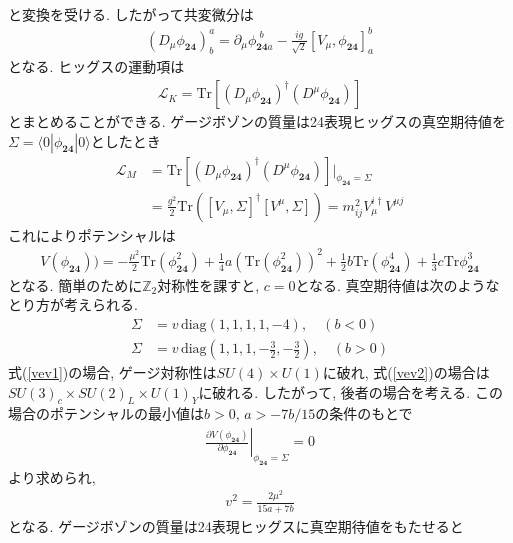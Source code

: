 \documentclass[uplatex,dvipdfmx,a4paper,titlepage]{jsbook}
\theoremstyle{plain}
\theoremstyle{definition}
\begin{document}
{\begin{align}
\end{align}
と変換を受ける.
したがって共変微分は
\begin{align}
  (D_\mu\phi_{\bm{24}})^a_b = \partial_\mu \phi_{\bm{24}a}^{\,\,b}  -\frac{ig}{\sqrt{2}}[V_\mu, \phi_{\bm{24}}]^b_{a}
\end{align}
となる.
ヒッグスの運動項は
\begin{align}
  \mathcal{L}_K = \mathrm{Tr}[(D_\mu \phi_{\bm{24}})^\dagger (D^\mu \phi_{\bm{24}})]
\end{align}
とまとめることができる.
ゲージボゾンの質量は24表現ヒッグスの真空期待値を$\Sigma = \langle 0|\phi_{\bm{24}}| 0\rangle$としたとき
\begin{align}
  \mathcal{L}_M &= \mathrm{Tr}[(D_\mu \phi_{\bm{24}})^\dagger (D^\mu \phi_{\bm{24}})]|_{\phi_{\bm{24}}=\Sigma}\nonumber\\
                &= \frac{g^2}{2}\mathrm{Tr}\left([V_\mu, \Sigma]^\dagger [V^\mu,\Sigma]\right) = m_{ij}^2 V_\mu^{i\dagger}V^{\mu j}
\end{align}
これによりポテンシャルは
\begin{align}
  V(\phi_{\bm{24}})) = -\frac{\mu^2}{2}\mathrm{Tr}(\phi_{\bm{24}}^2) +\frac{1}{4}a(\mathrm{Tr}(\phi_{\bm{24}}^2))^2 + \frac{1}{2}b\mathrm{Tr}(\phi_{\bm{24}}^4) + \frac{1}{3}c\mathrm{Tr}\phi_{\bm{24}}^3\nonumber
\end{align}
となる.
簡単のために$\mathbb{Z}_2$対称性を課すと, $c=0$となる.
真空期待値は次のようなとり方が考えられる.
\begin{align}
  \Sigma &= v\,\mathrm{diag}(1,1,1,1,-4),\quad(b<0)\label{vev1}\\
  \Sigma &= v\,\mathrm{diag}\left(1,1,1,-\frac{3}{2},-\frac{3}{2}\right),\quad(b>0)\label{vev2}
\end{align}
式(\ref{vev1})の場合, ゲージ対称性は$SU(4)\times U(1)$に破れ, 式(\ref{vev2})の場合は$SU(3)_c\times SU(2)_L\times U(1)_Y$に破れる.
したがって, 後者の場合を考える.
この場合のポテンシャルの最小値は$b>0,\, a>-{7b}/{15}$の条件のもとで
\begin{align}
  \left.\frac{\partial V(\phi_{\bm{24}})}{\partial \phi_{\bm{24}}} \right|_{\phi_{\bm{24}}=\Sigma} = 0
\end{align}
より求められ, 
\begin{align}
  v^2 = \frac{2\mu^2}{15a+7b}\nonumber
\end{align}
となる.
ゲージボゾンの質量は24表現ヒッグスに真空期待値をもたせると
}
\end{document}
